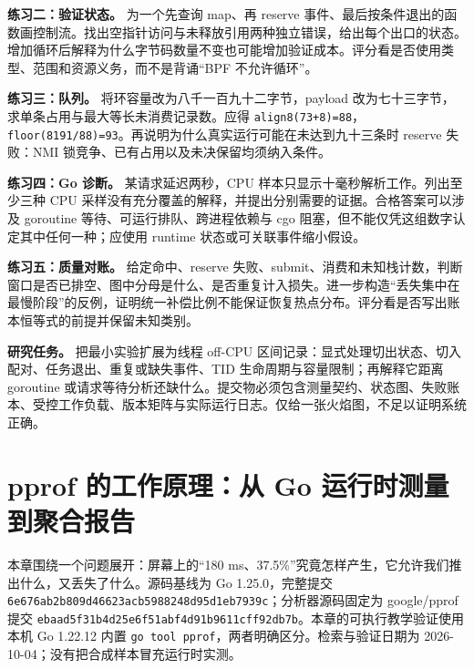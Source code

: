 \documentclass[UTF8,fontset=fandol,openany,11pt]{ctexbook}
\begin{document}
\textbf{练习二：验证状态。} 为一个先查询 map、再 reserve 事件、最后按条件退出的函数画控制流。找出空指针访问与未释放引用两种独立错误，给出每个出口的状态。增加循环后解释为什么字节码数量不变也可能增加验证成本。评分看是否使用类型、范围和资源义务，而不是背诵“BPF 不允许循环”。\cite{eb-verifier-doc}\cite{eb-verifier-code}\cite{eb-ring-doc}


\textbf{练习三：队列。} 将环容量改为八千一百九十二字节，payload 改为七十三字节，求单条占用与最大等长未消费记录数。应得 \texttt{align8(73+8)=88}，\texttt{floor(8191/\allowbreak{}88)=93}。再说明为什么真实运行可能在未达到九十三条时 reserve 失败：NMI 锁竞争、已有占用以及未决保留均须纳入条件。\cite{eb-ring-code}


\textbf{练习四：Go 诊断。} 某请求延迟两秒，CPU 样本只显示十毫秒解析工作。列出至少三种 CPU 采样没有充分覆盖的解释，并提出分别需要的证据。合格答案可以涉及 goroutine 等待、可运行排队、跨进程依赖与 cgo 阻塞，但不能仅凭这组数字认定其中任何一种；应使用 runtime 状态或可关联事件缩小假设。\cite{eb-go-runtime}\cite{eb-sched-trace}


\textbf{练习五：质量对账。} 给定命中、reserve 失败、submit、消费和未知栈计数，判断窗口是否已排空、图中分母是什么、是否重复计入损失。进一步构造“丢失集中在最慢阶段”的反例，证明统一补偿比例不能保证恢复热点分布。评分看是否写出账本恒等式的前提并保留未知类别。\cite{eb-ring-code}\cite{eb-ring-consume}\cite{eb-stackmap}


\textbf{研究任务。} 把最小实验扩展为线程 off-CPU 区间记录：显式处理切出状态、切入配对、任务退出、重复或缺失事件、TID 生命周期与容量限制；再解释它距离 goroutine 或请求等待分析还缺什么。提交物必须包含测量契约、状态图、失败账本、受控工作负载、版本矩阵与实际运行日志。仅给一张火焰图，不足以证明系统正确。\cite{eb-sched-trace}\cite{eb-sched-core}\cite{eb-go-runtime}


\chapter{pprof 的工作原理：从 Go 运行时测量到聚合报告}
\label{ch:19}

本章围绕一个问题展开：屏幕上的“180 ms、37.5\%”究竟怎样产生，它允许我们推出什么，又丢失了什么。源码基线为 Go 1.25.0，完整提交 \texttt{6e676ab2\allowbreak{}b809d466\allowbreak{}23acb598\allowbreak{}8248d95d\allowbreak{}1eb7939c}；分析器源码固定为 google/pprof 提交 \texttt{ebaad5f3\allowbreak{}1b4d25e6\allowbreak{}f51abf4d\allowbreak{}91b9611c\allowbreak{}ff92db7b}。本章的可执行教学验证使用本机 Go 1.22.12 内置 \texttt{go tool pprof}，两者明确区分。检索与验证日期为 2026-10-04；没有把合成样本冒充运行时实测。
\end{document}
